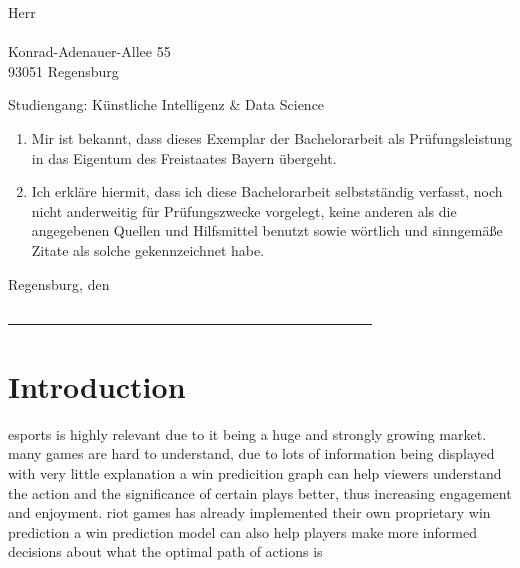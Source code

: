 \documentclass[12pt, a4paper, headinclude, twoside, plainheadsepline, open=right, numbers=noenddot, hidelinks, toc=listof, toc=bibliography]{scrreprt}
\begin{document}
\noindent
Herr\\
\@author\\
Konrad-Adenauer-Allee 55\\
93051 Regensburg\\
\smallskip

\noindent
Studiengang: Künstliche Intelligenz \& Data Science
\bigskip

\begin{enumerate}
\item Mir ist bekannt, dass dieses Exemplar der Bachelorarbeit als Prüfungsleistung in das Eigentum des Freistaates Bayern übergeht.
\item Ich erkläre hiermit, dass ich diese Bachelorarbeit selbstständig verfasst, noch nicht anderweitig für Prüfungszwecke vorgelegt, keine anderen als die angegebenen Quellen und Hilfsmittel benutzt sowie wörtlich und sinngemäße Zitate als solche gekennzeichnet habe.
\end{enumerate}
\vspace{1cm}
Regensburg, den \@date\\
\medskip
\medskip

\noindent
\underline{~~~~~~~~~~~~~~~~~~~~~~~~~~~~~~~~~~~~~~~~~~~~~~~~~~~~}\\
\@author

\makeatother




\cleardoublepage
{}\tableofcontents 										%




\pagestyle{scrheadings} 																%
\cleardoublepage
{} 																	%


\chapter{Introduction}
\label{chap:intro}


esports is highly relevant due to it being a huge and strongly growing market.
many games are hard to understand, due to lots of information being displayed with very little explanation
a win predicition graph can help viewers understand the action and the significance of certain plays better, thus increasing engagement and enjoyment.
riot games has already implemented their own proprietary win prediction
a win prediction model can also help players make more informed decisions about what the optimal path of actions is
\end{document}
